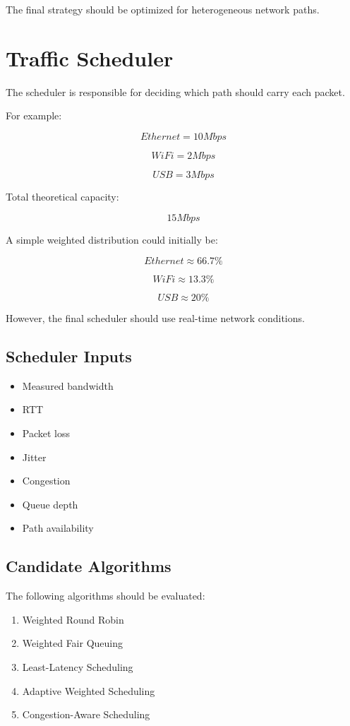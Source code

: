\documentclass[12pt,a4paper]{article}
\begin{document}
The final strategy should be optimized for heterogeneous network paths.


\section{Traffic Scheduler}

The scheduler is responsible for deciding which path should carry each packet.

For example:

\[
Ethernet = 10 Mbps
\]

\[
WiFi = 2 Mbps
\]

\[
USB = 3 Mbps
\]

Total theoretical capacity:

\[
15 Mbps
\]

A simple weighted distribution could initially be:

\[
Ethernet \approx 66.7\%
\]

\[
WiFi \approx 13.3\%
\]

\[
USB \approx 20\%
\]

However, the final scheduler should use real-time network conditions.

\subsection{Scheduler Inputs}

\begin{itemize}
    \item Measured bandwidth
    \item RTT
    \item Packet loss
    \item Jitter
    \item Congestion
    \item Queue depth
    \item Path availability
\end{itemize}

\subsection{Candidate Algorithms}

The following algorithms should be evaluated:

\begin{enumerate}
    \item Weighted Round Robin
    \item Weighted Fair Queuing
    \item Least-Latency Scheduling
    \item Adaptive Weighted Scheduling
    \item Congestion-Aware Scheduling
\end{enumerate}
\end{document}
